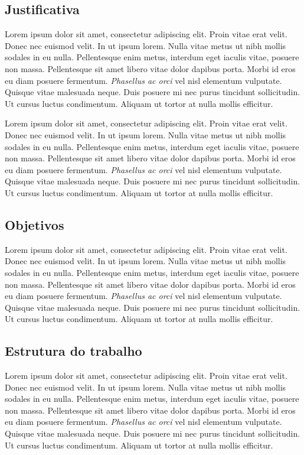 \documentclass[10pt, conference, compsocconf]{IEEEtran}
\begin{document}
\subsection{Justificativa}
Lorem ipsum dolor sit amet, consectetur adipiscing elit. Proin vitae erat velit. Donec nec euismod velit. In ut ipsum lorem. Nulla vitae metus ut nibh mollis sodales in eu nulla. Pellentesque enim metus, interdum eget iaculis vitae, posuere non massa. Pellentesque sit amet libero vitae dolor dapibus porta. Morbi id eros eu diam posuere fermentum. \textit{Phasellus ac orci} vel nisl elementum vulputate. Quisque vitae malesuada neque. Duis posuere mi nec purus tincidunt sollicitudin. Ut cursus luctus condimentum. Aliquam ut tortor at nulla mollis efficitur.

Lorem ipsum dolor sit amet, consectetur adipiscing elit. Proin vitae erat velit. Donec nec euismod velit. In ut ipsum lorem. Nulla vitae metus ut nibh mollis sodales in eu nulla. Pellentesque enim metus, interdum eget iaculis vitae, posuere non massa. Pellentesque sit amet libero vitae dolor dapibus porta. Morbi id eros eu diam posuere fermentum. \textit{Phasellus ac orci} vel nisl elementum vulputate. Quisque vitae malesuada neque. Duis posuere mi nec purus tincidunt sollicitudin. Ut cursus luctus condimentum. Aliquam ut tortor at nulla mollis efficitur.

\subsection{Objetivos}
Lorem ipsum dolor sit amet, consectetur adipiscing elit. Proin vitae erat velit. Donec nec euismod velit. In ut ipsum lorem. Nulla vitae metus ut nibh mollis sodales in eu nulla. Pellentesque enim metus, interdum eget iaculis vitae, posuere non massa. Pellentesque sit amet libero vitae dolor dapibus porta. Morbi id eros eu diam posuere fermentum. \textit{Phasellus ac orci} vel nisl elementum vulputate. Quisque vitae malesuada neque. Duis posuere mi nec purus tincidunt sollicitudin. Ut cursus luctus condimentum. Aliquam ut tortor at nulla mollis efficitur.

\subsection{Estrutura do trabalho}
Lorem ipsum dolor sit amet, consectetur adipiscing elit. Proin vitae erat velit. Donec nec euismod velit. In ut ipsum lorem. Nulla vitae metus ut nibh mollis sodales in eu nulla. Pellentesque enim metus, interdum eget iaculis vitae, posuere non massa. Pellentesque sit amet libero vitae dolor dapibus porta. Morbi id eros eu diam posuere fermentum. \textit{Phasellus ac orci} vel nisl elementum vulputate. Quisque vitae malesuada neque. Duis posuere mi nec purus tincidunt sollicitudin. Ut cursus luctus condimentum. Aliquam ut tortor at nulla mollis efficitur.
\end{document}
